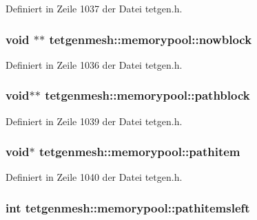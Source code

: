 Definiert in Zeile 1037 der Datei tetgen.\-h.

\hypertarget{classtetgenmesh_1_1memorypool_a63e80bcff81323ea491bfa189c15879b}{
\subsubsection[{nowblock}]{\setlength{\rightskip}{0pt plus 5cm}void $\ast$$\ast$ tetgenmesh\-::memorypool\-::nowblock}}\label{classtetgenmesh_1_1memorypool_a63e80bcff81323ea491bfa189c15879b}


Definiert in Zeile 1036 der Datei tetgen.\-h.

\hypertarget{classtetgenmesh_1_1memorypool_a6830e3c672f7a7546c2ea0ed70b2ac38}{
\subsubsection[{pathblock}]{\setlength{\rightskip}{0pt plus 5cm}void$\ast$$\ast$ tetgenmesh\-::memorypool\-::pathblock}}\label{classtetgenmesh_1_1memorypool_a6830e3c672f7a7546c2ea0ed70b2ac38}


Definiert in Zeile 1039 der Datei tetgen.\-h.

\hypertarget{classtetgenmesh_1_1memorypool_a216794c50c477f54c516ca4fad023df1}{
\subsubsection[{pathitem}]{\setlength{\rightskip}{0pt plus 5cm}void$\ast$ tetgenmesh\-::memorypool\-::pathitem}}\label{classtetgenmesh_1_1memorypool_a216794c50c477f54c516ca4fad023df1}


Definiert in Zeile 1040 der Datei tetgen.\-h.

\hypertarget{classtetgenmesh_1_1memorypool_ad83a51d49f6e03ff38151b870a2f51dd}{
\subsubsection[{pathitemsleft}]{\setlength{\rightskip}{0pt plus 5cm}int tetgenmesh\-::memorypool\-::pathitemsleft}}\label{classtetgenmesh_1_1memorypool_ad83a51d49f6e03ff38151b870a2f51dd}


